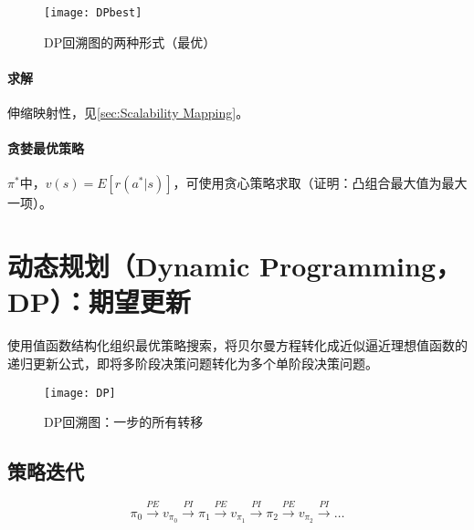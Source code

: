 \documentclass[
12pt, %
a4paper, 
oneside, %
headinclude,footinclude, %
]{scrartcl}
\begin{document}
\begin{figure}[H]
\centering 
\texttt{[image: DPbest]} 
\caption{DP回溯图的两种形式（最优）}
\end{figure}
\paragraph{求解}\label{sec:Scalability Mapping back}
伸缩映射性，见\ref{sec:Scalability Mapping}。
\paragraph{贪婪最优策略}
$ \pi^* $中，$ v(s) = E[r(a^*|s)] $，可使用贪心策略求取（证明：凸组合最大值为最大一项）。
\section[动态规划]{动态规划（Dynamic Programming，DP）：期望更新}
\noindent
\begin{minipage}{0.6\textwidth}
\hspace{2em}
使用值函数结构化组织最优策略搜索，将贝尔曼方程转化成近似逼近理想值函数的递归更新公式，即将多阶段决策问题转化为多个单阶段决策问题。
\end{minipage}
\begin{minipage}{0.4\textwidth}
\begin{figure}[H]
\centering 
\texttt{[image: DP]} 
\caption{DP回溯图：一步的所有转移}
\end{figure}
\end{minipage}
\subsection[策略迭代]{策略迭代}
$$ \pi_0 \xrightarrow{PE} v_{\pi_0} \xrightarrow{PI} \pi_1 \xrightarrow{PE} v_{\pi_1} \xrightarrow{PI} \pi_2 \xrightarrow{PE} v_{\pi_2} \xrightarrow{PI} \dots $$
\end{document}
